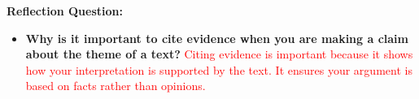 \documentclass[12pt]{article}
\begin{document}
\begin{tcolorbox}[colframe=black!60, colback=white, 
coltitle=black, colbacktitle=black!15, fonttitle=\bfseries\Large, 
title=Exit Ticket, halign title=center, left=10pt, right=10pt, top=10pt, bottom=15pt]
\textbf{Reflection Question:}
\begin{itemize}
    \item \textbf{Why is it important to cite evidence when you are making a claim about the theme of a text?} \textcolor{red}{Citing evidence is important because it shows how your interpretation is supported by the text. It ensures your argument is based on facts rather than opinions.}
\end{itemize}
\end{tcolorbox}
\end{document}
